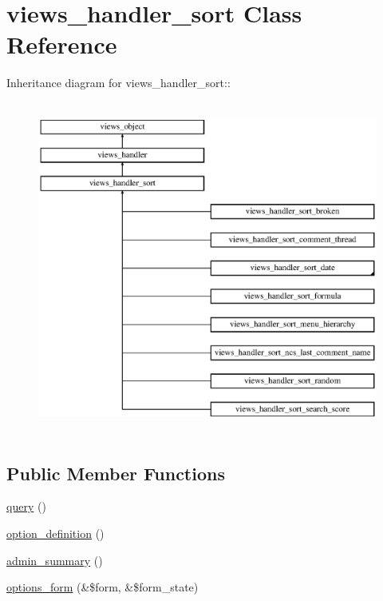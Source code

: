 \hypertarget{classviews__handler__sort}{
\section{views\_\-handler\_\-sort Class Reference}
\label{classviews__handler__sort}
}
Inheritance diagram for views\_\-handler\_\-sort::\begin{figure}[H]
\begin{center}
\leavevmode
\includegraphics[height=11cm]{classviews__handler__sort}
\end{center}
\end{figure}
\subsection*{Public Member Functions}
\begin{CompactItemize}
\item 
\hyperlink{classviews__handler__sort_94fa33c5d037e41a927583fce2df3d18}{query} ()
\item 
\hyperlink{classviews__handler__sort_f1e8382befe67b9cd07d0bbfa9b98266}{option\_\-definition} ()
\item 
\hyperlink{classviews__handler__sort_94271a6ce69bf4acb37047b01f0decaa}{admin\_\-summary} ()
\item 
\hyperlink{classviews__handler__sort_ba953218e09ab9da8f6ed0a67f046455}{options\_\-form} (\&\$form, \&\$form\_\-state)
\end{CompactItemize}


